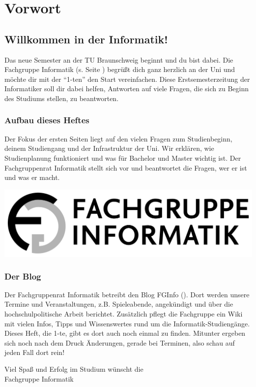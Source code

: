 
\section{Vorwort}
\label{vorwort}
	\begin{multicols}{2}
	\subsection*{Willkommen in der Informatik!}	

	Das neue Semester an der TU Braunschweig beginnt und du bist dabei. Die Fachgruppe Informatik (s. Seite \pageref{fachgruppe}) begrüßt dich ganz herzlich an der Uni und möchte dir mit der \enquote{1-ten} den Start vereinfachen. Diese Erstsemesterzeitung der Informatiker soll dir dabei helfen, Antworten auf viele Fragen, die sich zu Beginn des Studiums stellen, zu beantworten.

	\subsubsection*{Aufbau dieses Heftes}
		Der Fokus der ersten Seiten liegt auf den vielen Fragen zum Studienbeginn, deinem Studiengang und der Infrastruktur der Uni. Wir erklären, wie Studienplanung funktioniert und was für Bachelor und Master wichtig ist.
Der Fachgruppenrat Informatik stellt sich vor und beantwortet die Fragen, wer er ist und was er macht.


	\columnbreak

	\begin{center}
		\includegraphics[width=.7\columnwidth]{bilder/fg-logo/fg-logo.pdf}
	\end{center}

	\subsubsection*{Der Blog}
		Der Fachgruppenrat Informatik betreibt den Blog FGInfo (\fginfoUrl). Dort werden unsere Termine und Veranstaltungen, z.B. Spieleabende, angekündigt und über die hochschulpolitische Arbeit berichtet.
Zusätzlich pflegt die Fachgruppe ein Wiki mit vielen Infos, Tipps und Wissenswertes rund um die Informatik-Studiengänge.
Dieses Heft, die 1-te, gibt es dort auch noch einmal zu finden. Mitunter
ergeben sich noch nach dem Druck Änderungen, gerade bei Terminen, also schau auf jeden Fall dort rein!

	\vspace*{0.5cm}

	Viel Spaß und Erfolg im  Studium wünscht  die\\
	\hspace*{2cm}Fachgruppe Informatik

	\end{multicols}
